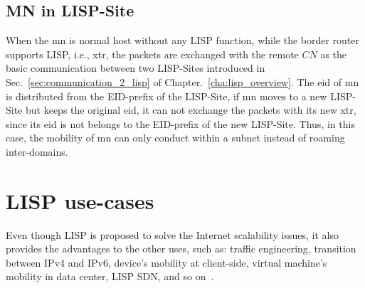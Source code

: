 \subsection{MN in LISP-Site}
\label{subsec:MN_LS}
When the \acrshort{mn} is normal host without any LISP function, while the border router supports LISP, i.e., \acrshort{xtr}, the packets are exchanged with the remote $CN$ as the basic communication between two LISP-Sites introduced in Sec.~\ref{sec:communication_2_lisp} of Chapter.~\ref{cha:lisp_overview}. The \acrshort{eid} of \acrshort{mn} is distributed from the EID-prefix of the LISP-Site, if \acrshort{mn} moves to a new LISP-Site but keeps the original \acrshort{eid}, it can not exchange the packets with its new \acrshort{xtr}, since its \acrshort{eid} is not belongs to the EID-prefix of the new LISP-Site. Thus, in this case, the mobility of \acrshort{mn} can only conduct within a subnet instead of roaming inter-domains.




\section{LISP use-cases}
\label{subsec:studies_usecase}
Even though LISP is proposed to solve the Internet scalability issues, it also provides the advantages to the other uses, such as: traffic engineering, transition between IPv4 and IPv6, device's mobility at client-side, virtual machine's mobility in data center, LISP SDN, and so on~\cite{rfc7834}. 

